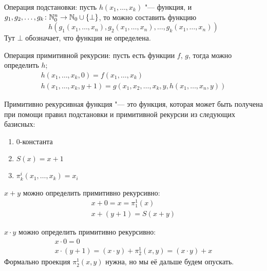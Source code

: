 \begin{Def}
	Операция подстановки:
	пусть $h(x_1, \dots, x_k)$ "--- функция, и $g_1, g_2, \dots, g_k \colon \mathbb{N}_0^n \to \mathbb{N}_0 \cup \{\bot\}$, то можно составить
	функцию
	\[
	h(g_1(x_1, \dots, x_n), g_2(x_1, \dots, x_n), \dots, g_k(x_1, \dots, x_n))
	\]
	Тут $\bot$ обозначает, что функция не определена.
\end{Def}
\begin{Def}
	Операция примитивной рекурсии:
	пусть есть функции $f$, $g$, тогда можно определить $h$;
	\begin{gather*}
	h(x_1, \dots, x_k, 0) = f(x_1, \dots, x_k) \\
	h(x_1, \dots, x_k, y+1) = g(x_1, x_2, \dots, x_k, y, h(x_1, \dots, x_n, y))
	\end{gather*}
\end{Def}
\begin{Def}
	Примитивно рекурсивная функция "--- это функция, которая может быть получена при помощи
	правил подстановки и примитивной рекурсии из следующих базисных:
	\begin{enumerate}
	\item $0$-константа
	\item $S(x)=x+1$
	\item $\pi_k^i(x_1, \dots, x_k)=x_i$
	\end{enumerate}
\end{Def}

\begin{exmp}
	$x+y$ можно определить примитивно рекурсивно:
	\begin{gather*}
	x+0=x=\pi_1^1(x) \\
	x+(y+1)=S(x+y)
	\end{gather*}
\end{exmp}
\begin{exmp}
	$x \cdot y$ можно определить примитивно рекурсивно:
	\begin{gather*}
	x\cdot 0=0 \\
	x\cdot(y+1)=(x\cdot y) + \pi_2^1(x, y) = (x\cdot y) + x
	\end{gather*}
	Формально проекция $\pi_2^1(x, y)$ нужна, но мы её дальше будем опускать.
\end{exmp}
